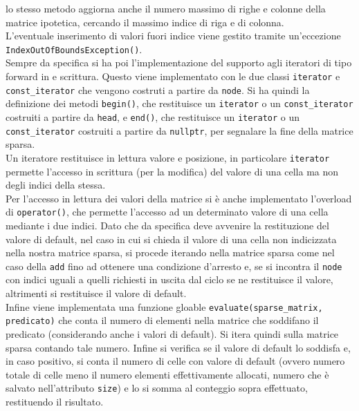 \documentclass[a4paper,12pt, oneside]{article}
\begin{document}
lo stesso metodo aggiorna anche il numero massimo di righe e colonne
della matrice ipotetica, cercando il massimo indice di riga e di
colonna.
\\
L'eventuale inserimento di valori fuori indice viene gestito tramite
un'eccezione \texttt{IndexOutOfBoundsException()}.\\
Sempre da specifica si ha poi l'implementazione del supporto agli
iteratori di tipo forward in e scrittura. Questo viene implementato
con le due classi \texttt{iterator} e \texttt{const\_iterator} che
vengono costruti a partire da \texttt{node}. Si ha quindi la
definizione dei metodi \texttt{begin()}, che restituisce un
\texttt{iterator} o un \texttt{const\_iterator} costruiti a partire da
\texttt{head}, e \texttt{end()}, che restituisce un
\texttt{iterator} o un \texttt{const\_iterator} costruiti a partire da
\texttt{nullptr}, per segnalare la fine della matrice sparsa. \\
Un iteratore restituisce in lettura valore e posizione, in particolare
\texttt{iterator} permette l'accesso in scrittura (per la modifica)
del valore di una cella ma non degli indici della stessa.\\
Per l'accesso in lettura dei valori della matrice si è anche
implementato l'overload di \texttt{operator()}, che permette l'accesso
ad un determinato valore di una cella mediante i due indici. Dato che
da specifica deve avvenire la restituzione del valore di default, nel
caso in cui si chieda il valore di una cella non indicizzata nella
nostra matrice sparsa, si procede iterando nella matrice sparsa come
nel caso della \texttt{add} fino ad ottenere una condizione d'arresto e, se
si incontra il \texttt{node} con indici uguali a quelli richiesti in
uscita dal ciclo se ne restituisce il valore, altrimenti si
restituisce il valore di default.\\
Infine viene implementata una funzione gloable
\texttt{evaluate(sparse\_matrix, predicato)} che conta il numero di
elementi nella matrice che soddifano il predicato (considerando anche
i valori di default). Si itera quindi sulla matrice sparsa contando
tale numero. Infine si verifica se il valore di default lo soddisfa e,
in caso positivo, si conta il numero di celle con valore di
default (ovvero numero totale di celle meno il numero elementi
effettivamente allocati, numero che è salvato nell'attributo
\texttt{size}) e lo si somma al conteggio sopra effettuato,
restituendo il risultato.
\newpage
\end{document}
